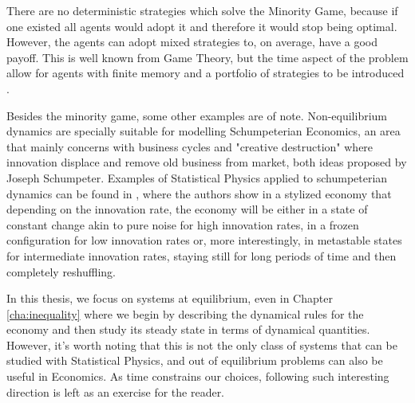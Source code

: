 There are no deterministic strategies which solve the Minority Game, because if one existed all agents would adopt it and therefore it would stop being optimal. However, the agents can adopt mixed strategies to, on average, have a good payoff. This is well known from Game Theory, but the time aspect of the problem allow for agents with finite memory and a portfolio of strategies to be introduced \cite{MinorityGames99, MinorityGames00}.

Besides the minority game, some other examples are of note. Non-equilibrium dynamics are specially suitable for modelling Schumpeterian Economics, an area that mainly concerns with business cycles and "creative destruction" where innovation displace and  remove old business from market, both ideas proposed by Joseph Schumpeter. Examples of Statistical Physics applied to schumpeterian dynamics can be found in \cite{thurner}, where the authors show in a stylized economy that depending on the innovation rate, the economy will be either in a state of constant change akin to pure noise for high innovation rates, in a frozen configuration for low innovation rates or, more interestingly, in metastable states for intermediate innovation rates, staying still for long periods of time and then completely reshuffling.

In this thesis, we focus on systems at equilibrium, even in Chapter \ref{cha:inequality} where we begin by describing the dynamical rules for the economy and then study its steady state in terms of dynamical quantities. However, it's worth noting that this is not the only class of systems that can be studied with Statistical Physics, and out of equilibrium problems can also be useful in Economics. As time constrains our choices, following such interesting direction is left as an exercise for the reader.